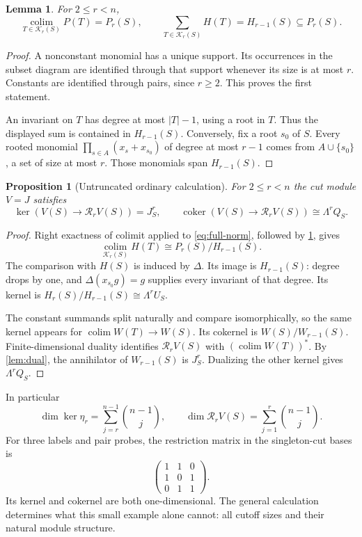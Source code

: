 \documentclass[11pt,a4paper]{article}
\newtheorem{proposition}[theorem]{Proposition}
\newtheorem{lemma}[theorem]{Lemma}
\theoremstyle{definition}
\theoremstyle{remark}
\newcommand{\Rr}{\mathcal R_r}
\newcommand{\Kpos}{\mathcal K_r(S)}
\newcommand{\coker}{\operatorname{coker}}
\newcommand{\colim}{\operatorname*{colim}}
\begin{document}
\begin{lemma}\label{lem:colim-poly}
For $2\le r<n$,
\[
 \colim_{T\in\Kpos}P(T)=P_r(S),\qquad
 \sum_{T\in\Kpos}H(T)=H_{r-1}(S)\subseteq P_r(S).
\]
\end{lemma}
\begin{proof}
A nonconstant monomial has a unique support. Its occurrences in the subset diagram are identified through that support whenever its size is at most $r$. Constants are identified through pairs, since $r\ge2$. This proves the first statement.

An invariant on $T$ has degree at most $|T|-1$, using a root in $T$. Thus the displayed sum is contained in $H_{r-1}(S)$. Conversely, fix a root $s_0$ of $S$. Every rooted monomial $\prod_{s\in A}(x_s+x_{s_0})$ of degree at most $r-1$ comes from $A\cup\{s_0\}$, a set of size at most $r$. Those monomials span $H_{r-1}(S)$.
\end{proof}

\begin{proposition}[Untruncated ordinary calculation]\label{prop:ordinaryV}
For $2\le r<n$ the cut module $V=J$ satisfies
\[
 \ker(V(S)\to\Rr V(S))=J_S^r,
 \qquad \coker(V(S)\to\Rr V(S))\cong\Lambda^r Q_S.
\]
\end{proposition}
\begin{proof}
Right exactness of colimit applied to \eqref{eq:full-norm}, followed by \cref{lem:colim-poly}, gives
\[
 \colim_{\Kpos}H(T)\cong P_r(S)/H_{r-1}(S).
\]
The comparison with $H(S)$ is induced by $\Delta$. Its image is $H_{r-1}(S)$: degree drops by one, and $\Delta(x_{s_0}g)=g$ supplies every invariant of that degree. Its kernel is $H_r(S)/H_{r-1}(S)\cong\Lambda^rU_S$.

The constant summands split naturally and compare isomorphically, so the same kernel appears for $\colim W(T)\to W(S)$. Its cokernel is $W(S)/W_{r-1}(S)$. Finite-dimensional duality identifies $\Rr V(S)$ with $(\colim W(T))^*$. By \cref{lem:dual}, the annihilator of $W_{r-1}(S)$ is $J_S^r$. Dualizing the other kernel gives $\Lambda^rQ_S$.
\end{proof}

In particular
\[
 \dim\ker\eta_r=\sum_{j=r}^{n-1}\binom{n-1}{j},\qquad
 \dim\Rr V(S)=\sum_{j=1}^{r}\binom{n-1}{j}.
\]
For three labels and pair probes, the restriction matrix in the singleton-cut bases is
\[
 \begin{pmatrix}1&1&0\\1&0&1\\0&1&1\end{pmatrix}.
\]
Its kernel and cokernel are both one-dimensional. The general calculation determines what this small example alone cannot: all cutoff sizes and their natural module structure.
\end{document}
